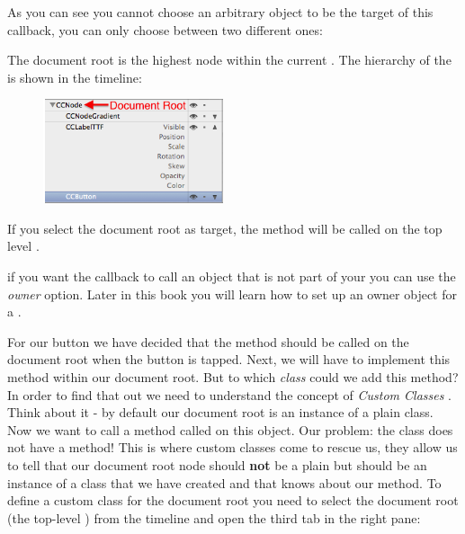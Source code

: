 As you can see you cannot choose an arbitrary object to be the target of this
callback, you can only choose between two different ones:
\begin{description}\label{DocumentRoot_Owner}
\item[Document Root] The document root is the highest node
within the current \ccbfile{}. The hierarchy of the \ccbfile{} is shown in the
\SB{} timeline: \begin{figure}[H]
		\centering
		\includegraphics[width=150pt]{images/firstproject/documentroot_node.png}
\end{figure}
If you select the document root as target, the  method
will be called on the top level \ccnode{}. 
\item[Owner] if you want the callback to call an object that is not part of your
\ccbfile{} you can use the \textit{owner} option. Later in this book you will
learn how to set up an owner object for a \ccbfile{}.
\end{description}

For our button we have decided that the  method should be
called on the document root when the button is tapped. Next, we will have to
implement this  method within our document root. But to
which \textit{class} could we add this method? In order to find that out we need to understand the
concept of \textit{Custom Classes} .
Think about it - by default our document root is an instance of a plain
\ccnode{} class.
Now we want to call a method called  on this object. Our
problem: the \ccnode{} class does not have a  method! This
is where custom classes come to rescue us, they allow us to tell \SB{} that our
document root node should \textbf{not} be a plain \ccnode{} but should be an
instance of a class that we have created and that knows about our
 method. To define a custom class for the document root
you need to select the document root (the top-level \ccnode{}) from the timeline
and open the third tab in the right pane:

